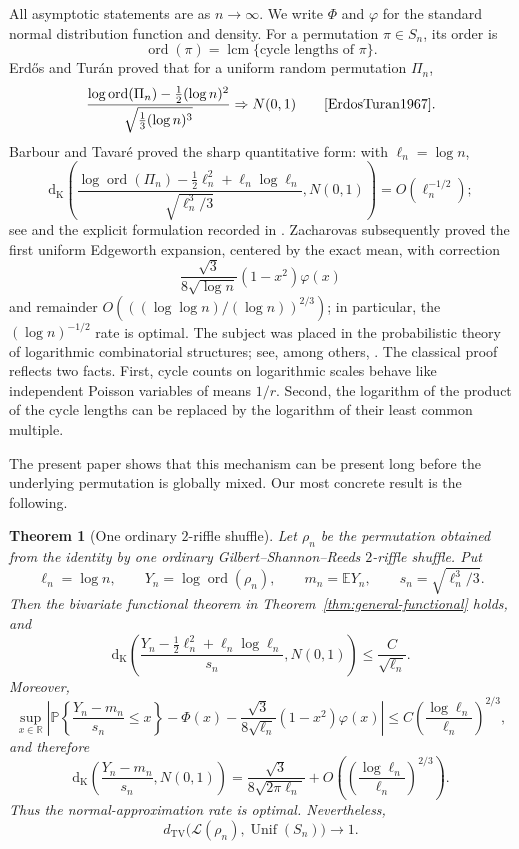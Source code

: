\documentclass[11pt]{article}
\newtheorem{theorem}{Theorem}[section]
\theoremstyle{definition}
\theoremstyle{remark}
\newcommand{\Pp}{\mathbb P}
\newcommand{\Ee}{\mathbb E}
\newcommand{\ord}{\operatorname{ord}}
\newcommand{\lcm}{\operatorname{lcm}}
\newcommand{\TV}{\mathrm{TV}}
\newcommand{\Kol}{\mathrm d_{\mathrm K}}
\newcommand{\cL}{\mathcal L}
\newcommand{\R}{\mathbb R}
\begin{document}
All asymptotic statements are as $n\to\infty$.  We write $\Phi$ and $\varphi$ for the standard normal distribution function and density.  For a permutation $\pi\in S_n$, its order is
\[
 \ord(\pi)=\lcm\{\text{cycle lengths of }\pi\}.
\]
Erd\H{o}s and Tur\'an proved that for a uniform random permutation
$\Pi_n$,
\[
 \frac{\log\ord(\Pi_n)-\frac12(\log n)^2}
 {\sqrt{\frac13(\log n)^3}}
 \Rightarrow N(0,1)
 \qquad\text{\cite{ErdosTuran1967}.}
\]
Barbour and Tavar\'e proved the sharp quantitative form: with
$\ell_n=\log n$,
\[
 \Kol\!\left(
 \frac{\log\ord(\Pi_n)-\frac12\ell_n^2
       +\ell_n\log\ell_n}
      {\sqrt{\ell_n^3/3}},
 N(0,1)
 \right)
 =O(\ell_n^{-1/2});
\]
see \cite{BarbourTavare1994} and the explicit formulation recorded in
\cite{Zacharovas2009}.  Zacharovas subsequently proved the first uniform
Edgeworth expansion, centered by the exact mean, with correction
\[
 \frac{\sqrt3}{8\sqrt{\log n}}(1-x^2)\varphi(x)
\]
and remainder $O(((\log\log n)/(\log n))^{2/3})$; in particular, the
$(\log n)^{-1/2}$ rate is optimal.  The subject was placed in the
probabilistic theory of logarithmic combinatorial structures; see, among
others, \cite{ArratiaTavare1992,ABT2003}.  The classical proof reflects two
facts.  First, cycle counts on logarithmic scales behave like independent
Poisson variables of means $1/r$.  Second, the logarithm of the product of
the cycle lengths can be replaced by the logarithm of their least common
multiple.

The present paper shows that this mechanism can be present long before the
underlying permutation is globally mixed.  Our most concrete result is the
following.

\begin{theorem}[One ordinary $2$-riffle shuffle]\label{thm:headline}
Let $\rho_n$ be the permutation obtained from the identity by one ordinary
Gilbert--Shannon--Reeds $2$-riffle shuffle.  Put
\[
 \ell_n=\log n,\qquad
 Y_n=\log\ord(\rho_n),\qquad
 m_n=\Ee Y_n,\qquad
 s_n=\sqrt{\ell_n^3/3}.
\]
Then the bivariate functional theorem in
Theorem~\ref{thm:general-functional} holds, and
\[
 \Kol\!\left(
 \frac{Y_n-\frac12\ell_n^2+\ell_n\log\ell_n}{s_n},
 N(0,1)
 \right)
 \le \frac{C}{\sqrt{\ell_n}}.
\]
Moreover,
\[
 \sup_{x\in\R}\left|
 \Pp\left\{\frac{Y_n-m_n}{s_n}\le x\right\}
 -\Phi(x)
 -\frac{\sqrt3}{8\sqrt{\ell_n}}(1-x^2)\varphi(x)
 \right|
 \le
 C\left(\frac{\log\ell_n}{\ell_n}\right)^{2/3},
\]
and therefore
\[
 \Kol\!\left(\frac{Y_n-m_n}{s_n},N(0,1)\right)
 =\frac{\sqrt3}{8\sqrt{2\pi\ell_n}}
 +O\!\left(\left(\frac{\log\ell_n}{\ell_n}\right)^{2/3}\right).
\]
Thus the normal-approximation rate is optimal.  Nevertheless,
\[
 d_{\TV}\bigl(\cL(\rho_n),\operatorname{Unif}(S_n)\bigr)\longrightarrow1.
\]
\end{theorem}
\end{document}
